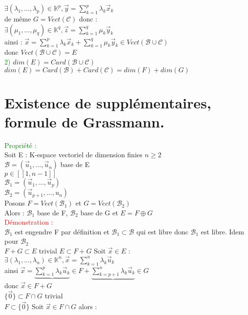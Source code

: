 \documentclass{article}
\begin{document}
$\exists (\lambda_1,..., \lambda_p)\in \mathbb K^p, \vec y=\sum_{k=1}^p \lambda_k \vec x_k$ \\
de même $G=Vect(\mathcal C)$ donc : \\
$\exists (\mu_1,..., \mu_q)\in \mathbb K^q, \vec z=\sum_{k=1}^q \mu_k \vec y_k$ \\
ainsi : $ \vec x =\sum_{k=1}^p \lambda_k \vec x_k +\sum_{k=1}^q \mu_k \vec y_k \in Vect(\mathcal B \cup \mathcal C)$ \\
donc $Vect(\mathcal B \cup \mathcal C)=E$ \\
\textcolor{green}{2)} $dim(E)= Card (\mathcal B \cup \mathcal C)$ \\
$dim(E)= Card (\mathcal B) + Card (\mathcal C)=dim(F)+dim(G)$
\section{Existence de supplémentaires, formule de Grassmann.}
\textcolor{green}{Propriété :} \\
Soit E : K-espace vectoriel de dimension finies $n \geq 2$ \\
$\mathcal B=(\vec u_1,..., \vec u_n)$ base de E \\
$p \in [[1,n-1]]$ \\
$\mathcal B_1=(\vec u_1,..., \vec u_p)$ \\
$\mathcal B_2=(\vec u_{p+1},...,u_n)$ \\
Posons $F=Vect(\mathcal B_1)$ et $G=Vect(\mathcal B_2)$ \\
Alors : $\mathcal B_1$ base de F, $\mathcal B_2$ base de G et $E= F \oplus G$ \\
\textcolor{red}{Démonstration :} \\
$\mathcal B_1$ est engendre F par définition et $\mathcal B_1 \subset \mathcal B$ qui est libre donc $\mathcal B_1$ est libre. Idem pour $\mathcal B_2$ \\
{\boldmath $F+G \subset E$} trivial
{\boldmath $E \subset F+G$} Soit $\vec x \in E$ : \\
$\exists (\lambda_1,...,\lambda_n) \in \mathbb K^n, \vec x= \sum_{k=1}^n \lambda_k \vec u_k$ \\
ainsi $\vec x= \underbrace{ \sum_{k=1}^p \lambda_k \vec u_k}{\in F} + \underbrace{\sum_{k=p+1}^n \lambda_k \vec u_k}{\in G}$ \\
donc $\vec x \in F + G$ \\
{\boldmath $\lbrace \vec 0 \rbrace \subset F \cap G$} trivial \\
{\boldmath $F \subset \lbrace \vec 0 \rbrace $} Soit $\vec x \in F \cap G$ alors : \\
\end{document}
